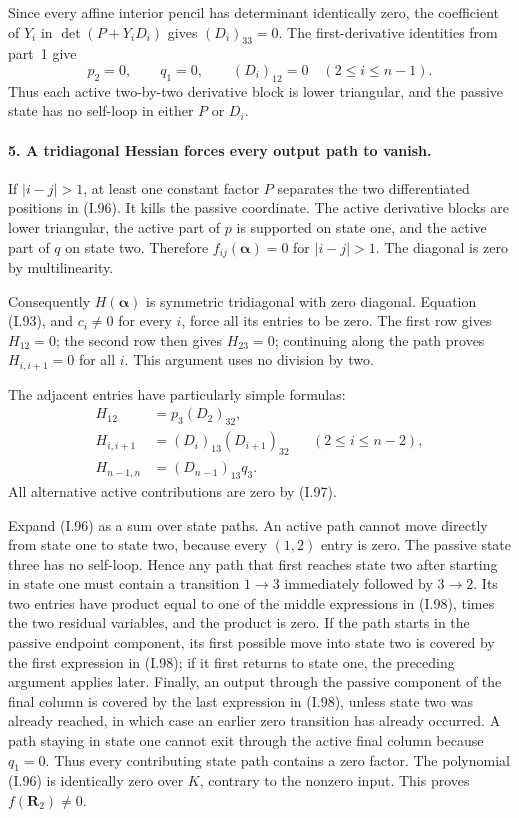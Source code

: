 Since every affine interior pencil has determinant identically
zero, the coefficient of $Y_i$ in
$\det(P+Y_iD_i)$ gives $(D_i)_{33}=0$. The first-derivative
identities from part~1 give
\[
 p_2=0,\qquad q_1=0,\qquad (D_i)_{12}=0
 \quad(2\le i\le n-1).
 \tag{I.97}
\]
Thus each active two-by-two derivative block is lower triangular,
and the passive state has no self-loop in either $P$ or $D_i$.

\paragraph{5. A tridiagonal Hessian forces every output path to vanish.}
If $|i-j|>1$, at least one constant factor $P$ separates the
two differentiated positions in (I.96). It kills the passive
coordinate. The active derivative blocks are lower triangular,
the active part of $p$ is supported on state one, and the active
part of $q$ on state two. Therefore $f_{ij}(\boldsymbol\alpha)=0$
for $|i-j|>1$. The diagonal is zero by multilinearity.

Consequently $H(\boldsymbol\alpha)$ is symmetric tridiagonal
with zero diagonal. Equation (I.93), and $c_i\ne0$ for every
$i$, force all its entries to be zero. The first row gives
$H_{12}=0$; the second row then gives $H_{23}=0$; continuing
along the path proves $H_{i,i+1}=0$ for all $i$. This argument
uses no division by two.

The adjacent entries have particularly simple formulas:
\[
 \begin{aligned}
 H_{12}&=p_3(D_2)_{32},\\
 H_{i,i+1}&=(D_i)_{13}(D_{i+1})_{32}
                 &&(2\le i\le n-2),\\
 H_{n-1,n}&=(D_{n-1})_{13}q_3.
 \end{aligned}
 \tag{I.98}
\]
All alternative active contributions are zero by (I.97).

Expand (I.96) as a sum over state paths. An active path cannot
move directly from state one to state two, because every
$(1,2)$ entry is zero. The passive state three has no self-loop.
Hence any path that first reaches state two after starting in
state one must contain a transition $1\to3$ immediately
followed by $3\to2$. Its two entries have product equal to
one of the middle expressions in (I.98), times the two residual
variables, and the product is zero. If the path starts in the
passive endpoint component, its first possible move into state
two is covered by the first expression in (I.98); if it first
returns to state one, the preceding argument applies later.
Finally, an output through the passive component of the final
column is covered by the last expression in (I.98), unless
state two was already reached, in which case an earlier zero
transition has already occurred. A path staying in state one
cannot exit through the active final column because $q_1=0$.
Thus every contributing state path contains a zero factor.
The polynomial (I.96) is identically zero over $K$, contrary
to the nonzero input. This proves $f(\mathbf R_2)\ne0$.

